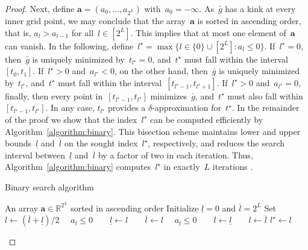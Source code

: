 \documentclass[11pt, a4paper, oneside, reqno]{article}
\begin{document}
{\begin{proof}
Next, define $\bm a = (a_0, \ldots, a_{2^{L} })$ with~$a_0 = -\infty$. As~$\bar g$ has a kink at every inner grid point, we may conclude that the array~$\bm a$ is sorted in ascending order, that is, $a_l> a_{l-1}$ for all~$l \in [2^L]$. This implies that at most one element of~$\bm a$ can vanish. In the following, define~$l^\star = \max\{l\in \{0\}\cup [2^{L}]: a_l \leq 0 \}$. If~$l^\star=0$, then~$\bar g$ is uniquely minimized by~$t_{l^\star}=0$, and~$t^\star$ must fall within the interval~$[t_0, t_1]$. If~$l^\star>0$ and~$a_{l^\star}<0$, on the other hand, then~$\bar g$ is uniquely minimized by~$t_{l^\star}$, and~$t^\star$ must fall within the interval~$[t_{l^\star-1},t_{l^\star + 1}]$. If~$l^\star>0$ and~$a_{l^\star}=0$, finally, then every point in~$[t_{l^\star-1}, t_{l^\star}]$ minimizes~$\bar g$, and~$t^\star$ must also fall within~$[t_{l^\star-1}, t_{l^\star}]$. In any case, $t_{l^\star}$ provides a $\delta$-approximation for~$t^\star$. In the remainder of the proof we show that the index~$l^\star$ can be computed efficiently by Algorithm~\ref{algorithm:binary}. This bisection scheme maintains lower and upper bounds~$\underline l$ and~$\overline l$ on the sought index~$l^\star$, respectively, and reduces the search interval between~$\underline l$ and~$\overline l$ by a factor of two in each iteration. Thus, Algorithm~\ref{algorithm:binary}  computes~$l^\star$ in exactly~$L$ iterations \cite[\S~12]{cormen2009introduction}.
    
    \begin{table}[H]
	\centering
	\begin{minipage}{0.6\textwidth}
    \vspace{-1em}
	\begin{algorithm}[H]
	\color{black}
	\caption{Binary search algorithm \label{algorithm:binary}}
		\begin{algorithmic}[1]
 			\Require An array $\bm a\in \mathbb R^{2^L}$ sorted in ascending order
			\State Initialize $\underline{l} = 0$ and $\overline{l} = 2^L$
			\State \hspace{-1ex}Set $l \gets {(\overline{l} + \underline{l})}/{2}$
			\State \hspace{-1ex}\algorithmicif~~$a_l \leq 0$~~\algorithmicthen~~$\underline{l} \gets l$~~\algorithmicelse~~$\overline{l} \gets l$
			\EndWhile	\vspace{0.1em}
			\State \algorithmicif~~$a_{\underline l} \leq 0$~~\algorithmicthen~~$l \gets \underline{l}$~~\algorithmicelse~~$l \gets \overline{l}$
			\Ensure ${l^\star \gets l}$
		\end{algorithmic}
	\end{algorithm}
	\vspace{-1em}
	\end{minipage}
    \end{table}
    

\end{proof}}
\end{document}
